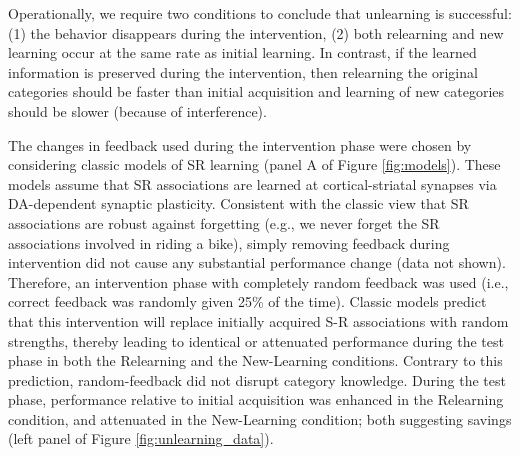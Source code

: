 \documentclass[man,apacite,draftfirst]{apa6} \usepackage{amsmath}
\begin{document}
Operationally, we require two conditions to conclude that unlearning is
successful: (1) the behavior disappears during the intervention, (2) both
relearning and new learning occur at the same rate as initial learning. In
contrast, if the learned information is preserved during the intervention, then
relearning the original categories should be faster than initial acquisition and
learning of new categories should be slower (because of interference).

The changes in feedback used during the intervention phase were chosen by
considering classic models of SR learning (panel A of Figure \ref{fig:models}).
These models assume that SR associations are learned at cortical-striatal
synapses via DA-dependent synaptic plasticity. Consistent with the classic view
that SR associations are robust against forgetting (e.g., we never forget the SR
associations involved in riding a bike), simply removing feedback during
intervention did not cause any substantial performance change (data not shown).
Therefore, an intervention phase with completely random feedback was used (i.e.,
correct feedback was randomly given 25\% of the time). Classic models predict
that this intervention will replace initially acquired S-R associations with
random strengths, thereby leading to identical or attenuated performance during
the test phase in both the Relearning and the New-Learning conditions. Contrary
to this prediction, random-feedback did not disrupt category knowledge. During
the test phase, performance relative to initial acquisition was enhanced in the
Relearning condition, and attenuated in the New-Learning condition; both
suggesting savings (left panel of Figure \ref{fig:unlearning_data}).
\end{document}
